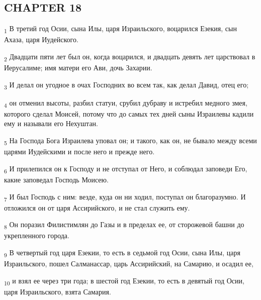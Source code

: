 \subsection{CHAPTER 18}
\begin{tcolorbox}
\textsubscript{1} В третий год Осии, сына Илы, царя Израильского, воцарился Езекия, сын Ахаза, царя Иудейского.
\end{tcolorbox}
\begin{tcolorbox}
\textsubscript{2} Двадцати пяти лет был он, когда воцарился, и двадцать девять лет царствовал в Иерусалиме; имя матери его Ави, дочь Захарии.
\end{tcolorbox}
\begin{tcolorbox}
\textsubscript{3} И делал он угодное в очах Господних во всем так, как делал Давид, отец его;
\end{tcolorbox}
\begin{tcolorbox}
\textsubscript{4} он отменил высоты, разбил статуи, срубил дубраву и истребил медного змея, которого сделал Моисей, потому что до самых тех дней сыны Израилевы кадили ему и называли его Нехуштан.
\end{tcolorbox}
\begin{tcolorbox}
\textsubscript{5} На Господа Бога Израилева уповал он; и такого, как он, не бывало между всеми царями Иудейскими и после него и прежде него.
\end{tcolorbox}
\begin{tcolorbox}
\textsubscript{6} И прилепился он к Господу и не отступал от Него, и соблюдал заповеди Его, какие заповедал Господь Моисею.
\end{tcolorbox}
\begin{tcolorbox}
\textsubscript{7} И был Господь с ним: везде, куда он ни ходил, поступал он благоразумно. И отложился он от царя Ассирийского, и не стал служить ему.
\end{tcolorbox}
\begin{tcolorbox}
\textsubscript{8} Он поразил Филистимлян до Газы и в пределах ее, от сторожевой башни до укрепленного города.
\end{tcolorbox}
\begin{tcolorbox}
\textsubscript{9} В четвертый год царя Езекии, то есть в седьмой год Осии, сына Илы, царя Израильского, пошел Салманассар, царь Ассирийский, на Самарию, и осадил ее,
\end{tcolorbox}
\begin{tcolorbox}
\textsubscript{10} и взял ее через три года; в шестой год Езекии, то есть в девятый год Осии, царя Израильского, взята Самария.
\end{tcolorbox}
